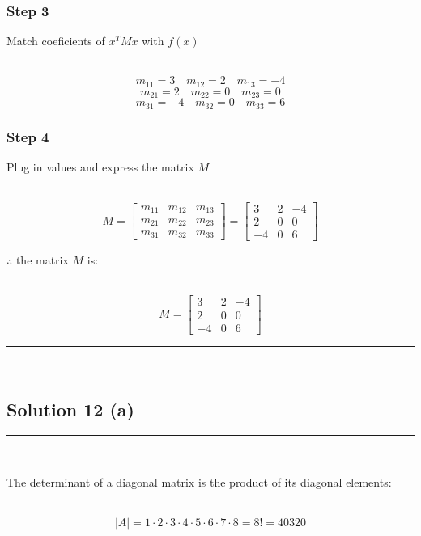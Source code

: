 \documentclass{article}
\begin{document}
\subsubsection*{Step 3}
\parbox{\textwidth}{Match coeficients of $x^{T}Mx$ with $f(x)$}\\

$$m_{11} = 3 \quad m_{12} = 2 \quad m_{13} = -4$$
$$m_{21} = 2 \quad m_{22} = 0 \quad m_{23} = 0$$
$$m_{31} = -4 \quad m_{32} = 0 \quad m_{33} = 6$$

\subsubsection*{Step 4}

\parbox{\textwidth}{Plug in values and express the matrix $M$}\\

$$M = \begin{bmatrix} m_{11} & m_{12} & m_{13} \\ m_{21} & m_{22} & m_{23} \\ m_{31} & m_{32} & m_{33} \end{bmatrix} = \begin{bmatrix} 3 & 2 & -4 \\ 2 & 0 & 0 \\ -4 & 0 & 6 \end{bmatrix}$$

\vspace{0.5cm}

\parbox{\textwidth}{$\therefore$ the matrix $M$ is:}\\

$$M = \begin{bmatrix} 3 & 2 & -4 \\ 2 & 0 & 0 \\ -4 & 0 & 6 \end{bmatrix}$$

\noindent\rule{\textwidth}{0.4pt}\\

\newpage
\subsection*{Solution 12 (a)}
\noindent\rule{\textwidth}{0.4pt}\\

\parbox{\textwidth}{The determinant of a diagonal matrix is the product of its diagonal elements:}\\

$$|A| = 1 \cdot 2 \cdot 3 \cdot 4 \cdot 5 \cdot 6 \cdot 7 \cdot 8 = 8! = 40320$$
\end{document}
